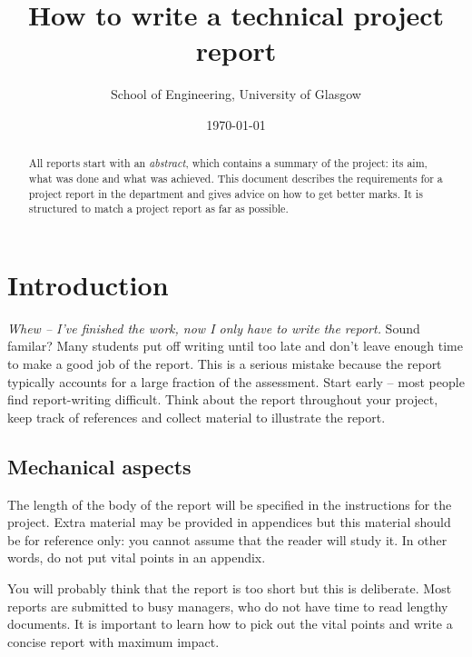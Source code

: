 \documentclass[a4paper,12pt]{article}
\begin{document}
\title{How to write a technical project report}
\author{School of Engineering, University of Glasgow}
\date{\today}
 
\maketitle

\begin{abstract}
All reports start with an \emph{abstract}, which contains a summary of the project: its aim, what was done and what was achieved. This document describes the requirements for a project report in the department and gives advice on how to get better marks. It is structured to match a project report as far as possible.
\end{abstract}


\section{Introduction}

\emph{Whew -- I've finished the work, now I only have to write the report.} Sound familar? Many students put off writing until too late and don't leave enough time to make a good job of the report. This is a serious mistake because the report typically accounts for a large fraction of the assessment. Start early -- most people find report-writing difficult. Think about the report throughout your project, keep track of references and collect material to illustrate the report.

\subsection{Mechanical aspects}

The length of the body of the report will be specified in the instructions for the project. Extra material may be provided in appendices but this material should be for reference only: you cannot assume that the reader will study it. In other words, do not put vital points in an appendix.

You will probably think that the report is too short but this is deliberate. Most reports are submitted to busy managers, who do not have time to read lengthy documents. It is important to learn how to pick out the vital points and write a concise report with maximum impact.
\end{document}
